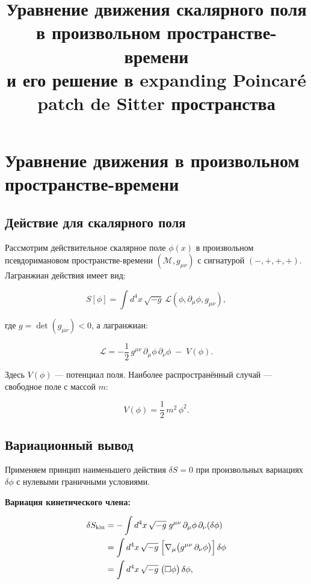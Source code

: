 \documentclass[12pt,a4paper]{article}
\title{Уравнение движения скалярного поля в произвольном пространстве-времени\\
и его решение в expanding Poincar\'e patch de Sitter пространства}
\author{}
\date{}
\begin{document}
\maketitle

\section{Уравнение движения в произвольном пространстве-времени}

\subsection{Действие для скалярного поля}

Рассмотрим действительное скалярное поле $\phi(x)$ в произвольном псевдоримановом
пространстве-времени $(\mathcal{M}, g_{\mu\nu})$ с сигнатурой $(-,+,+,+)$.
Лагранжиан действия имеет вид:

\begin{equation}
S[\phi] = \int d^4x\,\sqrt{-g}\,\mathcal{L}(\phi, \partial_\mu\phi, g_{\mu\nu}),
\end{equation}

где $g = \det(g_{\mu\nu}) < 0$, а лагранжиан:

\begin{equation}
\mathcal{L} = -\frac{1}{2}\,g^{\mu\nu}\,\partial_\mu\phi\,\partial_\nu\phi \;-\; V(\phi).
\end{equation}

Здесь $V(\phi)$ — потенциал поля. Наиболее распространённый случай — свободное поле
с массой $m$:

\begin{equation}
V(\phi) = \frac{1}{2}\,m^2\,\phi^2.
\end{equation}

\subsection{Вариационный вывод}

Применяем принцип наименьшего действия $\delta S = 0$ при произвольных вариациях
$\delta\phi$ с нулевыми граничными условиями.

\textbf{Вариация кинетического члена:}

\begin{align}
\delta S_{\text{kin}} &= -\int d^4x\,\sqrt{-g}\; g^{\mu\nu}\,\partial_\mu\phi\,\partial_\nu(\delta\phi) \\
&= \int d^4x\,\sqrt{-g}\;\Bigl[\nabla_\mu\bigl(g^{\mu\nu}\,\partial_\nu\phi\bigr)\Bigr]\,\delta\phi \\
&= \int d^4x\,\sqrt{-g}\;\bigl(\Box\phi\bigr)\,\delta\phi,
\end{align}
\end{document}
